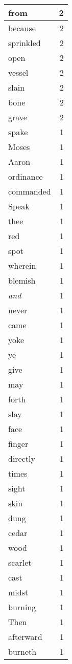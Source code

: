 \begin{center}
\begin{longtable}{l|r}
from & 2 \\ \hline
because & 2 \\ \hline
sprinkled & 2 \\ \hline
open & 2 \\ \hline
vessel & 2 \\ \hline
slain & 2 \\ \hline
bone & 2 \\ \hline
grave & 2 \\ \hline
spake & 1 \\ \hline
Moses & 1 \\ \hline
Aaron & 1 \\ \hline
ordinance & 1 \\ \hline
commanded & 1 \\ \hline
Speak & 1 \\ \hline
thee & 1 \\ \hline
red & 1 \\ \hline
spot & 1 \\ \hline
wherein & 1 \\ \hline
blemish & 1 \\ \hline
\emph{and} & 1 \\ \hline
never & 1 \\ \hline
came & 1 \\ \hline
yoke & 1 \\ \hline
ye & 1 \\ \hline
give & 1 \\ \hline
may & 1 \\ \hline
forth & 1 \\ \hline
slay & 1 \\ \hline
face & 1 \\ \hline
finger & 1 \\ \hline
directly & 1 \\ \hline
times & 1 \\ \hline
sight & 1 \\ \hline
skin & 1 \\ \hline
dung & 1 \\ \hline
cedar & 1 \\ \hline
wood & 1 \\ \hline
scarlet & 1 \\ \hline
cast & 1 \\ \hline
midst & 1 \\ \hline
burning & 1 \\ \hline
Then & 1 \\ \hline
afterward & 1 \\ \hline
burneth & 1 \\ \hline

\end{longtable}
\end{center}
